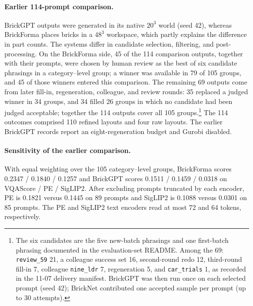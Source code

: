 \documentclass[letterpaper]{article} %
\begin{document}


\paragraph{Earlier 114-prompt comparison.} BrickGPT outputs were generated in its native $20^3$ world (seed 42), whereas BrickForma places bricks in a $48^3$ workspace, which partly explains the difference in part counts.
The systems differ in candidate selection, filtering, and post-processing.
On the BrickForma side, 45 of the 114 comparison outputs, together with their prompts, were chosen by human review as the best of six candidate phrasings in a category--level group; a winner was available in 79 of 105 groups, and 45 of those winners entered this comparison.
The remaining 69 outputs come from later fill-in, regeneration, colleague, and review rounds: 35 replaced a judged winner in 34 groups, and 34 filled 26 groups in which no candidate had been judged acceptable; together the 114 outputs cover all 105 groups.\footnote{The six candidates are the five new-batch phrasings and one first-batch phrasing documented in the evaluation-set README. Among the 69: \texttt{review\_59} 21, a colleague success set 16, second-round redo 12, third-round fill-in 7, colleague \texttt{nine\_ldr} 7, regeneration 5, and \texttt{car\_trials} 1, as recorded in the 11-07 delivery manifest. BrickGPT was then run once on each selected prompt (seed 42); BrickNet contributed one accepted sample per prompt (up to 30 attempts).}
The 114 outcomes comprised 110 refined layouts and four raw layouts. The earlier BrickGPT records report an eight-regeneration budget and Gurobi disabled.

\paragraph{Sensitivity of the earlier comparison.}
With equal weighting over the 105 category--level groups, BrickForma scores 0.2347 / 0.1840 / 0.1257 and BrickGPT scores 0.1511 / 0.1459 / 0.0318 on VQAScore / PE / SigLIP2. After excluding prompts truncated by each encoder, PE is 0.1821 versus 0.1445 on 89 prompts and SigLIP2 is 0.1088 versus 0.0301 on 85 prompts. The PE and SigLIP2 text encoders read at most 72 and 64 tokens, respectively.
\end{document}
